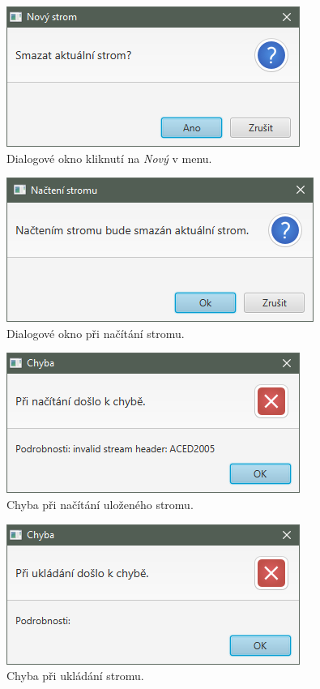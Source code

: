 \documentclass[
  biblatex=false,
  font=serif,
  glossaries=false,
  tables=false,
  theorems=false,
  index
]{kidiplom}
\begin{document}
\begin{figure}[h!]
\centering
	\includegraphics[scale=0.8]{obrazky/38Dialog4.png}
	\caption{Dialogové okno kliknutí na \textit{Nový} v menu.}
	\label{dialogMenuNovy}
\end{figure}

\begin{figure}[h!]
\centering
	\includegraphics[scale=0.8]{obrazky/41Dialog7.png}
	\caption{Dialogové okno při načítání stromu.}
	\label{dialogMenuNacist}
\end{figure}

\begin{figure}[h!]
\centering
	\includegraphics[scale=0.8]{obrazky/39Dialog5}
	\caption{Chyba při načítání uloženého stromu.}
	\label{dialogChyba1}
\end{figure}

\begin{figure}[h!]
\centering
	\includegraphics[scale=0.8]{obrazky/40Dialog6.png}
	\caption{Chyba při ukládání stromu.}
	\label{dialogChyba2}
\end{figure}
\end{document}
